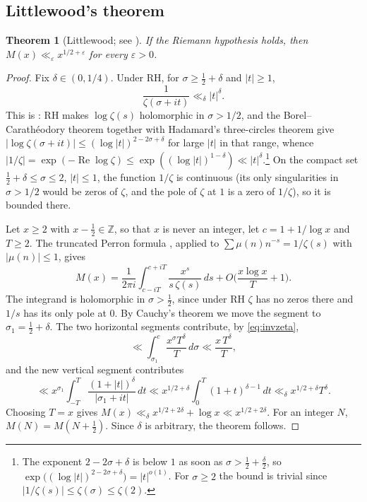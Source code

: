 \documentclass[11pt]{amsart}
\numberwithin{equation}{section}
\theoremstyle{plain}
\newtheorem{thm}{Theorem}[section]
\theoremstyle{definition}
\theoremstyle{remark}
\newcommand{\Z}{\mathbb{Z}}
\renewcommand{\Re}{\operatorname{Re}}
\begin{document}
\subsection{Littlewood's theorem}

\begin{thm}[Littlewood; see {\cite[\S14.25]{Tit86}}]\label{thm:littlewood}
If the Riemann hypothesis holds, then $M(x)\ll_\varepsilon x^{1/2+\varepsilon}$ for every $\varepsilon>0$.
\end{thm}

\begin{proof}
Fix $\delta\in(0,1/4)$. Under RH, for $\sigma\ge\frac12+\delta$ and $|t|\ge1$,
\begin{equation}\label{eq:invzeta}
\frac{1}{\zeta(\sigma+it)}\ll_\delta |t|^{\delta}.
\end{equation}
This is \cite[\S14.2]{Tit86}: RH makes $\log\zeta(s)$ holomorphic in $\sigma>1/2$, and the Borel--Carathéodory theorem together with Hadamard's three-circles theorem give $|\log\zeta(\sigma+it)|\le(\log|t|)^{2-2\sigma+\delta}$ for large $|t|$ in that range, whence $|1/\zeta|=\exp(-\Re\log\zeta)\le\exp((\log|t|)^{1-\delta})\ll|t|^\delta$.\footnote{The exponent $2-2\sigma+\delta$ is below $1$ as soon as $\sigma>\frac12+\frac\delta2$, so $\exp\big((\log|t|)^{2-2\sigma+\delta}\big)=|t|^{o(1)}$. For $\sigma\ge 2$ the bound is trivial since $|1/\zeta(s)|\le\zeta(\sigma)\le\zeta(2)$.} On the compact set $\frac12+\delta\le\sigma\le2$, $|t|\le1$, the function $1/\zeta$ is continuous (its only singularities in $\sigma>1/2$ would be zeros of $\zeta$, and the pole of $\zeta$ at $1$ is a zero of $1/\zeta$), so it is bounded there.

Let $x\ge2$ with $x-\frac12\in\Z$, so that $x$ is never an integer, let $c=1+1/\log x$ and $T\ge2$. The truncated Perron formula \cite[Corollary~5.3]{MV07}, applied to $\sum\mu(n)n^{-s}=1/\zeta(s)$ with $|\mu(n)|\le1$, gives
\[
M(x)=\frac{1}{2\pi i}\int_{c-iT}^{c+iT}\frac{x^s}{s\,\zeta(s)}\,ds+O\Big(\frac{x\log x}{T}+1\Big).
\]
The integrand is holomorphic in $\sigma>\frac12$, since under RH $\zeta$ has no zeros there and $1/s$ has its only pole at $0$. By Cauchy's theorem we move the segment to $\sigma_1=\frac12+\delta$. The two horizontal segments contribute, by \eqref{eq:invzeta},
\[
\ll\int_{\sigma_1}^{c}\frac{x^{\sigma}T^{\delta}}{T}\,d\sigma\ll\frac{x\,T^\delta}{T},
\]
and the new vertical segment contributes
\[
\ll x^{\sigma_1}\int_{-T}^{T}\frac{(1+|t|)^{\delta}}{|\sigma_1+it|}\,dt\ll x^{1/2+\delta}\int_0^T(1+t)^{\delta-1}\,dt\ll_\delta x^{1/2+\delta}T^{\delta}.
\]
Choosing $T=x$ gives $M(x)\ll_\delta x^{1/2+2\delta}+\log x\ll x^{1/2+2\delta}$. For an integer $N$, $M(N)=M(N+\frac12)$. Since $\delta$ is arbitrary, the theorem follows.
\end{proof}
\end{document}

